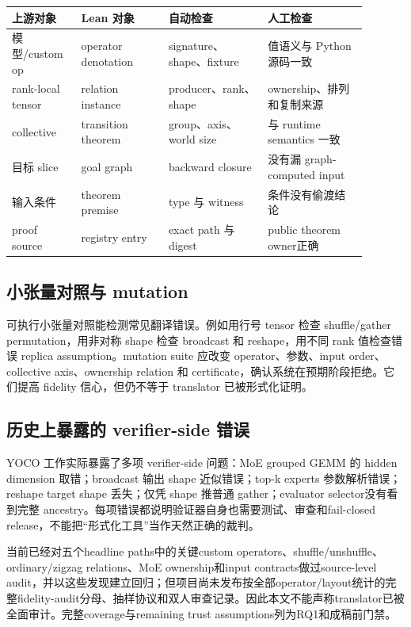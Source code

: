 \documentclass[10.5pt,a4paper]{ctexart}
\begin{document}
\begin{longtable}{L{0.17\linewidth}L{0.22\linewidth}L{0.25\linewidth}L{0.25\linewidth}}
\toprule
上游对象 & Lean 对象 & 自动检查 & 人工检查 \\
\midrule
模型/custom op & operator denotation & signature、shape、fixture & 值语义与 Python 源码一致 \\
rank-local tensor & relation instance & producer、rank、shape & ownership、排列和复制来源 \\
collective & transition theorem & group、axis、world size & 与 runtime semantics 一致 \\
目标 slice & goal graph & backward closure & 没有漏 graph-computed input \\
输入条件 & theorem premise & type 与 witness & 条件没有偷渡结论 \\
proof source & registry entry & exact path 与 digest & public theorem owner正确 \\
\bottomrule
\end{longtable}

\subsection{小张量对照与 mutation}

可执行小张量对照能检测常见翻译错误。例如用行号 tensor 检查 shuffle/gather permutation，用非对称 shape 检查 broadcast 和 reshape，用不同 rank 值检查错误 replica assumption。mutation suite 应改变 operator、参数、input order、collective axis、ownership relation 和 certificate，确认系统在预期阶段拒绝。它们提高 fidelity 信心，但仍不等于 translator 已被形式化证明。

\subsection{历史上暴露的 verifier-side 错误}

YOCO 工作实际暴露了多项 verifier-side 问题：MoE grouped GEMM 的 hidden dimension 取错；broadcast 输出 shape 近似错误；top-k experts 参数解析错误；reshape target shape 丢失；仅凭 shape 推普通 gather；evaluator selector没有看到完整 ancestry。每项错误都说明验证器自身也需要测试、审查和fail-closed release，不能把“形式化工具”当作天然正确的裁判。

当前已经对五个headline paths中的关键custom operators、shuffle/unshuffle、ordinary/zigzag relations、MoE ownership和input contracts做过source-level audit，并以这些发现建立回归；但项目尚未发布按全部operator/layout统计的完整fidelity-audit分母、抽样协议和双人审查记录。因此本文不能声称translator已被全面审计。完整coverage与remaining trust assumptions列为RQ1和成稿前门禁。
\end{document}
